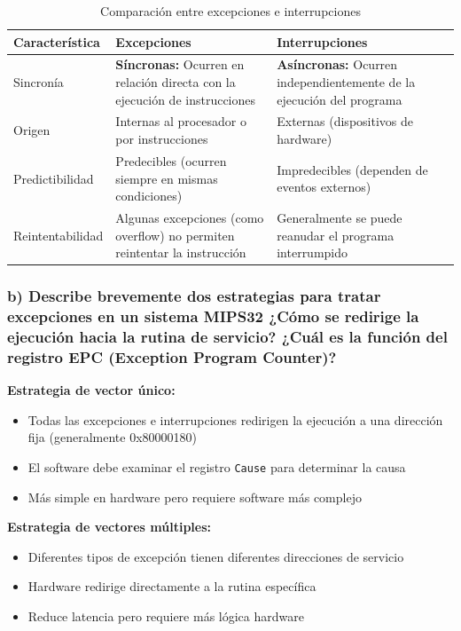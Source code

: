 \documentclass[12pt]{article}
\begin{document}
\begin{table}[h]
	\centering
	\begin{tabular}{|p{3cm}|p{5cm}|p{5cm}|}
		\hline
		\textbf{Característica} & \textbf{Excepciones} & \textbf{Interrupciones} \\
		\hline
		Sincronía & \textbf{Síncronas:} Ocurren en relación directa con la ejecución de instrucciones & \textbf{Asíncronas:} Ocurren independientemente de la ejecución del programa \\
		\hline
		Origen & Internas al procesador o por instrucciones & Externas (dispositivos de hardware) \\
		\hline
		Predictibilidad & Predecibles (ocurren siempre en mismas condiciones) & Impredecibles (dependen de eventos externos) \\
		\hline
		Reintentabilidad & Algunas excepciones (como overflow) no permiten reintentar la instrucción & Generalmente se puede reanudar el programa interrumpido \\
		\hline
	\end{tabular}
	\caption{Comparación entre excepciones e interrupciones}
\end{table}

\subsubsection{b) Describe brevemente dos estrategias para tratar excepciones en un sistema MIPS32 ¿Cómo se redirige la ejecución hacia la rutina de servicio? ¿Cuál es la función del registro EPC (Exception Program Counter)?}

\textbf{Estrategia de vector único:}
\begin{itemize}
	\item Todas las excepciones e interrupciones redirigen la ejecución a una dirección fija (generalmente 0x80000180)
	\item El software debe examinar el registro \texttt{Cause} para determinar la causa
	\item Más simple en hardware pero requiere software más complejo
\end{itemize}

\textbf{Estrategia de vectores múltiples:}
\begin{itemize}
	\item Diferentes tipos de excepción tienen diferentes direcciones de servicio
	\item Hardware redirige directamente a la rutina específica
	\item Reduce latencia pero requiere más lógica hardware
\end{itemize}
\end{document}
